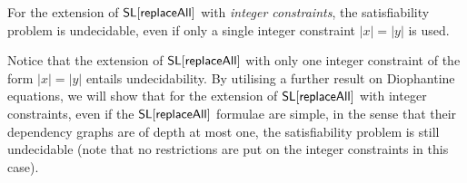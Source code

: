 

\begin{theorem}\label{thm-ext-int}
	For the extension of $\mathsf{SL}[\mathsf{replaceAll}]$ with \emph{integer constraints}, the satisfiability problem is undecidable, even if only a single integer constraint $|x| = |y|$ is used.
\end{theorem}


%

Notice that the extension of $\mathsf{SL}[\mathsf{replaceAll}]$ with only one integer constraint of the form $|x| = |y|$ entails undecidability. By utilising a further result on Diophantine equations, we will show that for the extension of $\mathsf{SL}[\mathsf{replaceAll}]$ with integer constraints, even if the $\mathsf{SL}[\mathsf{replaceAll}]$ formulae are simple, in the sense that their dependency graphs are of depth at most one, the satisfiability problem is still undecidable (note that no restrictions are put on the integer constraints in this case).


